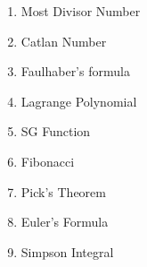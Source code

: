 

\begin{enumerate}
    \normalsize \item Most Divisor Number \par
        \tiny 
    \normalsize \item Catlan Number \par
        \tiny 
    \normalsize \item Faulhaber's formula \par
        \tiny 
    \normalsize \item Lagrange Polynomial \par
        \tiny 
    \normalsize \item SG Function \par
        \tiny 
    \normalsize \item Fibonacci \par
        \tiny 
    \normalsize \item Pick's Theorem \par
        \tiny 
    \normalsize \item Euler's Formula \par
        \tiny 
    \normalsize \item Simpson Integral \par
        \tiny 
\end{enumerate}